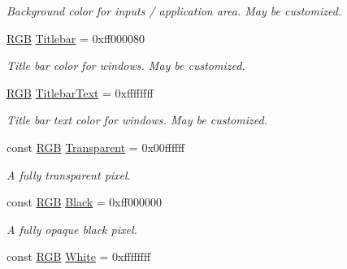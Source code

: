 \begin{DoxyCompactItemize}
\begin{DoxyCompactList}\small\item\em Background color for inputs / application area. May be customized. \end{DoxyCompactList}\item 
\hypertarget{namespaceGUI_1_1Color_ad920563eb1961c9b846af6daa8e5f8c7}{\hyperlink{namespaceGUI_aeafd135255365f3584da0e982fc79466}{R\-G\-B} \hyperlink{namespaceGUI_1_1Color_ad920563eb1961c9b846af6daa8e5f8c7}{Titlebar} = 0xff000080}\label{namespaceGUI_1_1Color_ad920563eb1961c9b846af6daa8e5f8c7}

\begin{DoxyCompactList}\small\item\em Title bar color for windows. May be customized. \end{DoxyCompactList}\item 
\hypertarget{namespaceGUI_1_1Color_abae1054f06525ac5741b40bffe83fdbf}{\hyperlink{namespaceGUI_aeafd135255365f3584da0e982fc79466}{R\-G\-B} \hyperlink{namespaceGUI_1_1Color_abae1054f06525ac5741b40bffe83fdbf}{Titlebar\-Text} = 0xffffffff}\label{namespaceGUI_1_1Color_abae1054f06525ac5741b40bffe83fdbf}

\begin{DoxyCompactList}\small\item\em Title bar text color for windows. May be customized. \end{DoxyCompactList}\item 
\hypertarget{namespaceGUI_1_1Color_a7ec3cc2d0178f404a31dac73d2048a10}{const \hyperlink{namespaceGUI_aeafd135255365f3584da0e982fc79466}{R\-G\-B} \hyperlink{namespaceGUI_1_1Color_a7ec3cc2d0178f404a31dac73d2048a10}{Transparent} = 0x00ffffff}\label{namespaceGUI_1_1Color_a7ec3cc2d0178f404a31dac73d2048a10}

\begin{DoxyCompactList}\small\item\em A fully transparent pixel. \end{DoxyCompactList}\item 
\hypertarget{namespaceGUI_1_1Color_acd1c748baf35a0185c7afec4c6103485}{const \hyperlink{namespaceGUI_aeafd135255365f3584da0e982fc79466}{R\-G\-B} \hyperlink{namespaceGUI_1_1Color_acd1c748baf35a0185c7afec4c6103485}{Black} = 0xff000000}\label{namespaceGUI_1_1Color_acd1c748baf35a0185c7afec4c6103485}

\begin{DoxyCompactList}\small\item\em A fully opaque black pixel. \end{DoxyCompactList}\item 
\hypertarget{namespaceGUI_1_1Color_a829219859d7031df61c849c3369c30b7}{const \hyperlink{namespaceGUI_aeafd135255365f3584da0e982fc79466}{R\-G\-B} \hyperlink{namespaceGUI_1_1Color_a829219859d7031df61c849c3369c30b7}{White} = 0xffffffff}\label{namespaceGUI_1_1Color_a829219859d7031df61c849c3369c30b7}


\end{DoxyCompactItemize}
